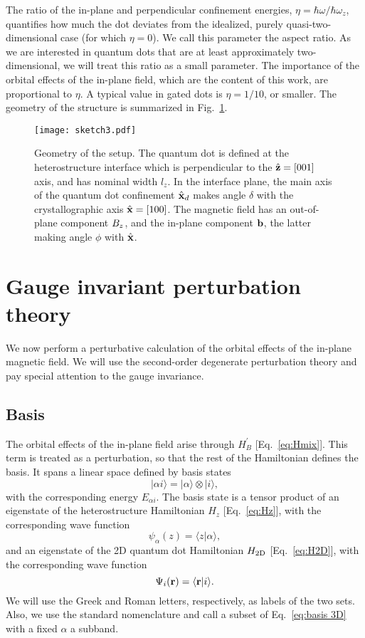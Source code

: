 \documentclass[aps,floatfix,twocolumn,showpacs,10pt,nofootinbib]{revtex4-1}
\newcommand{\be}{\begin{equation}}
\newcommand{\ee}{\end{equation}}
\begin{document}
The ratio of the in-plane and perpendicular confinement energies, $\eta=\hbar \omega / \hbar \omega_z$, quantifies how much the dot deviates from the idealized, purely quasi-two-dimensional case (for which $\eta=0$). We call this parameter the aspect ratio. As we are interested in quantum dots that are at least approximately two-dimensional, we will treat this ratio as a small parameter. The importance of the orbital effects of the in-plane field, which are the content of this work, are proportional to $\eta$.  A typical value in gated dots is $\eta =1/10$, or smaller.
The geometry of the structure is summarized in Fig.~\ref{fig:sketch}.

\begin{figure}
\texttt{[image: sketch3.pdf]}
\caption{\label{fig:sketch}
Geometry of the setup. The quantum dot is defined at the heterostructure interface which is perpendicular to the $\hat{\textbf{z}}=[001]$ axis, and has nominal width $l_z$. In the interface plane, the main axis of the quantum dot confinement $\hat{\textbf{x}}_d$ makes angle $\delta$ with the crystallographic axis $\hat{\textbf{x}}=[100]$. The magnetic field has an out-of-plane component $B_z$, and the in-plane component $\textbf{b}$, the latter making angle $\phi$ with $\hat{\textbf{x}}$.}
\end{figure}



\section{Gauge invariant perturbation theory}

We now perform a perturbative calculation of the orbital effects of the in-plane magnetic field. We will use the second-order degenerate perturbation theory and pay special attention to the gauge invariance.

\subsection{Basis}

The orbital effects of the in-plane field arise through $H^\prime_B$ [Eq.~\eqref{eq:Hmix}]. This term is treated as a perturbation, so that the rest of the Hamiltonian defines the basis. It spans a linear space defined by basis states
\be
|\alpha i\rangle = |\alpha\rangle \otimes |i\rangle,
\label{eq:basis 3D}
\ee
with the corresponding energy $E_{\alpha i}$. The basis state is a tensor product
of an eigenstate of the heterostructure Hamiltonian $H_z$ [Eq.~\eqref{eq:Hz}], with the corresponding wave function
\be
\psi_\alpha(z) = \langle z | \alpha \rangle,
\label{eq:basis 1D}
\ee
and an eigenstate of the 2D quantum dot Hamiltonian $H_{\rm 2D}$ [Eq.~\eqref{eq:H2D}], with the corresponding wave function
\be
\Psi_i(\Rin) = \langle \Rin |i \rangle.
\label{eq:basis 2D}
\ee
We will use the Greek and Roman letters, respectively, as labels of the two sets. Also, we use the standard nomenclature and call a subset of Eq.~\eqref{eq:basis 3D} with a fixed $\alpha$ a subband.
\end{document}
